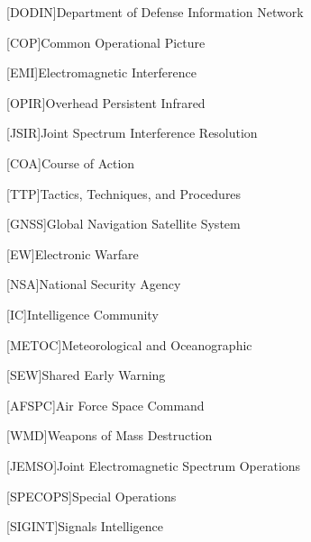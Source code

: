 [DODIN]{Department of Defense Information Network}

[COP]{Common Operational Picture}

[EMI]{Electromagnetic Interference}

[OPIR]{Overhead Persistent Infrared}

[JSIR]{Joint Spectrum Interference Resolution}

[COA]{Course of Action}

[TTP]{Tactics, Techniques, and Procedures}

[GNSS]{Global Navigation Satellite System}

[EW]{Electronic Warfare}

[NSA]{National Security Agency}

[IC]{Intelligence Community}

[METOC]{Meteorological and Oceanographic}

[SEW]{Shared Early Warning}

[AFSPC]{Air Force Space Command}

[WMD]{Weapons of Mass Destruction}

[JEMSO]{Joint Electromagnetic Spectrum Operations}

[SPECOPS]{Special Operations}

[SIGINT]{Signals Intelligence}
